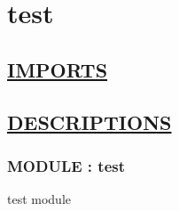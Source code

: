 \chapter*{test}

\section*{\underline{IMPORTS}}

\section*{\underline{DESCRIPTIONS}}
\subsection*{MODULE : test}
\hypertarget{ecldoc:test_test}{}
test module \\
